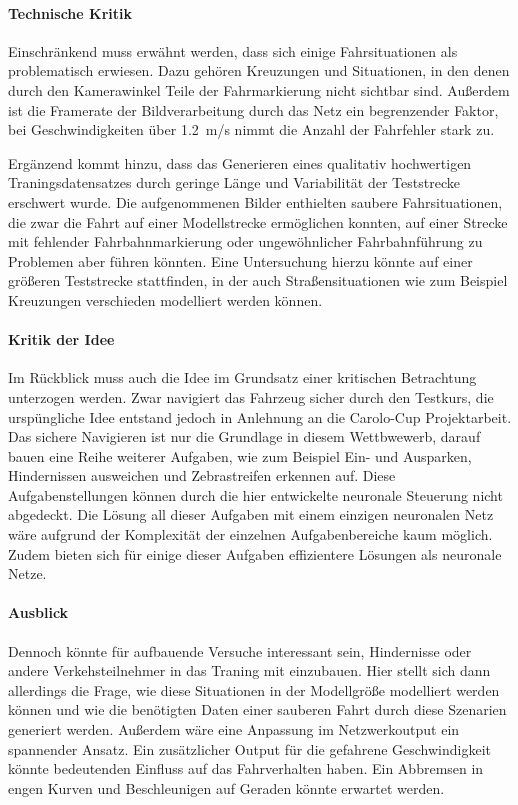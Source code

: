 \paragraph{Technische Kritik}
Einschränkend muss erwähnt werden, dass sich einige Fahrsituationen als problematisch erwiesen. Dazu gehören Kreuzungen und Situationen, in den denen durch den Kamerawinkel Teile der Fahrmarkierung nicht sichtbar sind. Außerdem ist die Framerate der Bildverarbeitung durch das Netz ein begrenzender Faktor, bei Geschwindigkeiten über \SI{1.2}{\meter/\second} nimmt die Anzahl der Fahrfehler stark zu.

Ergänzend kommt hinzu, dass das Generieren eines qualitativ hochwertigen Traningsdatensatzes durch geringe Länge und Variabilität der Teststrecke erschwert wurde. Die aufgenommenen Bilder enthielten saubere Fahrsituationen, die zwar die Fahrt auf einer Modellstrecke ermöglichen konnten, auf einer Strecke mit fehlender Fahrbahnmarkierung oder ungewöhnlicher Fahrbahnführung zu Problemen aber führen könnten. Eine Untersuchung hierzu könnte auf einer größeren Teststrecke stattfinden, in der auch Straßensituationen wie zum Beispiel Kreuzungen verschieden modelliert werden können.

\paragraph{Kritik der Idee}
Im Rückblick muss auch die Idee im Grundsatz einer kritischen Betrachtung unterzogen werden. Zwar navigiert das Fahrzeug sicher durch den Testkurs, die urspüngliche Idee entstand jedoch in Anlehnung an die Carolo-Cup Projektarbeit. Das sichere Navigieren ist nur die Grundlage in diesem Wettbwewerb, darauf bauen eine Reihe weiterer Aufgaben, wie zum Beispiel Ein- und Ausparken, Hindernissen ausweichen und Zebrastreifen erkennen auf. Diese Aufgabenstellungen können durch die hier entwickelte neuronale Steuerung nicht abgedeckt. Die Lösung all dieser Aufgaben mit einem einzigen neuronalen Netz wäre aufgrund der Komplexität der einzelnen Aufgabenbereiche kaum möglich. Zudem bieten sich für einige dieser Aufgaben effizientere Lösungen als neuronale Netze.

\paragraph{Ausblick}
Dennoch könnte für aufbauende Versuche interessant sein, Hindernisse oder andere Verkehsteilnehmer in das Traning mit einzubauen. Hier stellt sich dann allerdings die Frage, wie diese Situationen in der Modellgröße modelliert werden können und wie die benötigten Daten einer sauberen Fahrt durch diese Szenarien generiert werden. Außerdem wäre eine Anpassung im Netzwerkoutput ein spannender Ansatz. Ein zusätzlicher Output für die gefahrene Geschwindigkeit könnte bedeutenden Einfluss auf das Fahrverhalten haben. Ein Abbremsen in engen Kurven und Beschleunigen auf Geraden könnte erwartet werden.

